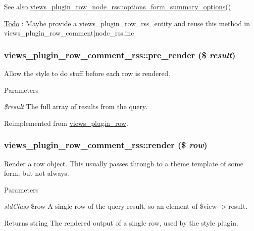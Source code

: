 \begin{DoxySeeAlso}{See also}
\hyperlink{classviews__plugin__row__node__rss_a266e0776cfa7c86a98453b59215da8aa}{views\_\-plugin\_\-row\_\-node\_\-rss::options\_\-form\_\-summary\_\-options()} 
\end{DoxySeeAlso}
\begin{Desc}
\item[\hyperlink{todo__todo000081}{Todo}]: Maybe provide a views\_\-plugin\_\-row\_\-rss\_\-entity and reuse this method in views\_\-plugin\_\-row\_\-comment$|$node\_\-rss.inc \end{Desc}
\hypertarget{classviews__plugin__row__comment__rss_a1c64dc0cd4f677ddb85a0dbedfae291e}{
\subsubsection[{pre\_\-render}]{\setlength{\rightskip}{0pt plus 5cm}views\_\-plugin\_\-row\_\-comment\_\-rss::pre\_\-render (\$ {\em result})}}
\label{classviews__plugin__row__comment__rss_a1c64dc0cd4f677ddb85a0dbedfae291e}
Allow the style to do stuff before each row is rendered.


\begin{DoxyParams}{Parameters}
\item[{\em \$result}]The full array of results from the query. \end{DoxyParams}


Reimplemented from \hyperlink{classviews__plugin__row_ae49a23f750874e4b3d294aa3a20ecd64}{views\_\-plugin\_\-row}.\hypertarget{classviews__plugin__row__comment__rss_a89b115cbc1807d3b9659627f351b97e7}{
\subsubsection[{render}]{\setlength{\rightskip}{0pt plus 5cm}views\_\-plugin\_\-row\_\-comment\_\-rss::render (\$ {\em row})}}
\label{classviews__plugin__row__comment__rss_a89b115cbc1807d3b9659627f351b97e7}
Render a row object. This usually passes through to a theme template of some form, but not always.


\begin{DoxyParams}{Parameters}
\item[{\em stdClass}]\$row A single row of the query result, so an element of \$view-\/$>$result.\end{DoxyParams}
\begin{DoxyReturn}{Returns}
string The rendered output of a single row, used by the style plugin. 
\end{DoxyReturn}


